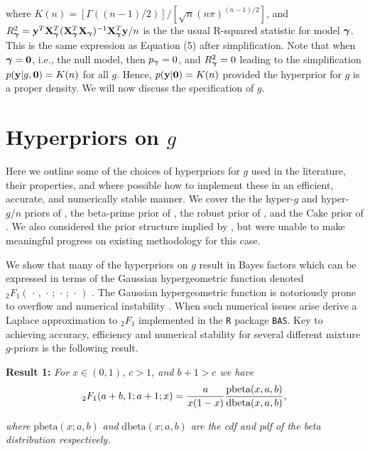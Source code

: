 \noindent where $K(n) = [\Gamma( (n-1)/2 )]/[\sqrt{n}(n\pi)^{(n-1)/2}]$, and
$R_{\boldsymbol \gamma}^2 =
{\bf y}^T{\bf X}_{\boldsymbol \gamma}^T({\bf X}_{\boldsymbol \gamma}^T{\bf X}_{\boldsymbol \gamma})^{-1}{\bf X}_{\boldsymbol \gamma}^T{\bf y}/n$ is the the
usual R-squared statistic for model ${\boldsymbol \gamma}$.  This is the same expression as
\cite{Liang2008} Equation (5) after simplification. Note that when ${\boldsymbol \gamma} =
{\bf 0}$, i.e., the null model, then $p_{\boldsymbol \gamma} = 0$, and $R_{\boldsymbol \gamma}^2 = 0$
leading to the simplification $p({\bf y}|g,{\bf 0}) = K(n)$ for all $g$. Hence,
$p({\bf y}|{\bf 0}) = K(n)$ provided the hyperprior for $g$ is a proper density. We
will now discuss the specification of $g$.


\section{Hyperpriors on $g$}
\label{sec:hyperpriors}

Here we outline some of the choices of hyperpriors for $g$ used in the
literature, their properties, and where possible how to implement these in an
efficient, accurate, and numerically stable manner. We cover the the hyper-$g$
and hyper-$g/n$ priors of \cite{Liang2008}, the beta-prime prior of
\cite{Maruyama2011}, the robust prior of \cite{Bayarri2012}, and the Cake prior
of \cite{OrmerodEtal2017}.  We also considered the prior structure implied by
\cite{Zellner1980}, but were unable to make meaningful progress on existing
methodology for this case.

We show that many of the hyperpriors on $g$ result in Bayes factors which can
be expressed in terms of the Gaussian hypergeometric function denoted
${}_2F_1(\,\cdot\,,\,\cdot\,;\,\cdot\,;\,\cdot\,)$ \citep[see for example
Chapter 15 of ][]{Abramowitz1972}.  The Gaussian hypergeometric function is
notoriously prone to overflow and numerical instability \citep{Pearson2017}.
When such numerical issues arise \cite{Liang2008} derive a Laplace
approximation to ${}_2F_1$ implemented in the {\tt R} package {\tt BAS}.  Key
to achieving accuracy, efficiency and numerical stability for several different
mixture $g$-priors is the following result.

\smallskip 
\noindent 
{\bf Result 1:} {\it For $x\in(0,1)$, $c>1$, and $b +1 > c$ we have}
\begin{equation}\label{eq:logGuassHypergeometric2}
	\displaystyle {}_2F_1(a+b,1;a+1;x) = \frac{a}{x(1 - x)}   \frac{\mbox{pbeta}(x,a,b)}{\mbox{dbeta}(x,a,b)},
\end{equation}

\noindent 
{\it where} $\mbox{pbeta}(x;a,b)$ {\it and} $\mbox{dbeta}(x;a,b)$ {\it are the cdf and pdf of the beta 
	distribution respectively.}

